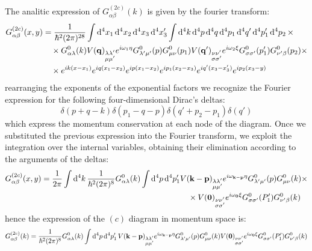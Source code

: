 \documentclass[a4paper]{article}
\begin{document}
The analitic expression of $G^{(2c)}_{\alpha\beta}(k)$ is given by the fourier transform:
\begin{align*}
G^{(2c)}_{\alpha\beta}(x,y) &=  \frac{1}{\hbar^2(2\pi)^{28}}\int \dd[4]{x_1}\dd[4]{x_2}\dd[4]{x_3}\dd[4]{x_3'}\int \dd[4]{k}\dd[4]{p}\dd[4]{q}\dd[4]{p_1}\dd[4]{q'}\dd[4]{p_1'}\dd[4]{p_2} \times \\
&\quad \times G^0_{\alpha\lambda}(k) V(\vb{q})_{\substack{\lambda\lambda' \\ \mu\mu'}}e^{i\omega_1 \eta} G^0_{\lambda'\mu'}(p) G^0_{\mu\nu}(p_1) V(\vb{q}')_{\substack{\nu\nu'\\ \sigma\sigma'}}e^{i\omega_2 \xi} G^0_{\sigma\sigma'}(p_1')G^0_{\nu'\beta}(p_2) \times \\
&\quad \times e^{ik(x-x_1)}e^{iq(x_1-x_2)}e^{ip(x_1-x_2)}e^{ip_1(x_2-x_3)}e^{iq'(x_3-x_3')}e^{ip_2(x_3-y)}
\end{align*}
rearranging the exponents of the exponential factors we recognize the Fourier expression for the following four-dimensional Dirac's deltas:
\begin{equation*}
\delta(p+q-k)\delta(p_1-q-p)\delta(q'+p_2-p_1)\delta(q')
\end{equation*}
which express the momentum conservation at each node of the diagram.
Once we substituted the previous expression into the Fourier transform, we exploit the integration over the internal variables, obtaining their elimination according to the arguments of the deltas:
\begin{align*}
G^{(2c)}_{\alpha\beta}(x,y) = \frac{1}{2\pi}\int \dd[4]{k}\frac{1}{\hbar^2(2\pi)^8} G^0_{\alpha\lambda}(k)\int \dd[4]{p} \dd[4]{p_1'}& V(\vb{k}-\vb{p})_{\substack{\lambda\lambda'\\ \mu\mu'}}e^{i\omega_{\vb{k}-\vb{p}} \eta}G^0_{\lambda'\mu'}(p) G^0_{\mu\nu}(k) \times \\
&\quad \times V(\vb{0})_{\substack{\nu\nu'\\ \sigma\sigma'}}e^{i\omega_{\vb{0}}\xi}G^0_{\sigma\sigma'}(P_1')G^0_{\nu'\beta}(k)
\end{align*}
hence the expression of the $(c)$ diagram in momentum space is:
\begin{equation*}
G^{(2c)}_{\alpha\beta}(k) = \frac{1}{\hbar^2(2\pi)^8} G^0_{\alpha\lambda}(k)\int \dd[4]{p} \dd[4]{p_1'}V(\vb{k}-\vb{p})_{\substack{\lambda\lambda'\\ \mu\mu'}}e^{i\omega_{\vb{k}-\vb{p}} \eta}G^0_{\lambda'\mu'}(p) G^0_{\mu\nu}(k) V(\vb{0})_{\substack{\nu\nu'\\ \sigma\sigma'}}e^{i\omega_{\vb{0}}\xi}G^0_{\sigma\sigma'}(P_1')G^0_{\nu'\beta}(k)
\end{equation*}
\end{document}
